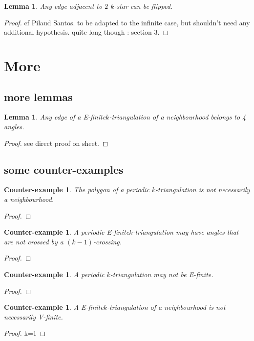 \documentclass{amsart}
\newtheorem{lemma}[theorem]{Lemma}
\newtheorem{ce}[theorem]{Counter-example}
\theoremstyle{remark}
\newcommand*{\nbd}[0]{neighbourhood\xspace}
\newcommand*{\ef}[0]{E-finite\xspace}
\newcommand*{\vf}[0]{V-finite\xspace}
\newcommand*{\ktg}[0]{$k$-triangulation\xspace}
\begin{document}
\begin{lemma}
Any edge adjacent to $2$ $k$-star can be flipped.
\end{lemma}
\begin{proof}
cf Pilaud Santos. to be adapted to the infinite case, but shouldn't need any additional hypothesis. quite long though : section 3.
\end{proof}

\section{More}

\subsection{more lemmas}

\begin{lemma} 
Any edge of a \ef \ktg of a \nbd belongs to 4 angles. 
\end{lemma}
\begin{proof}
see direct proof on sheet.
\end{proof}

\subsection{some counter-examples}

\begin{ce}
The polygon of a periodic \ktg is not necessarily a \nbd.
\end{ce}
\begin{proof}

\end{proof}

\begin{ce}
A periodic \ef \ktg may have angles that are not crossed by a $(k-1)$-crossing.
\end{ce}
\begin{proof}

\end{proof}

\begin{ce} 
A periodic \ktg may not be \ef.
\end{ce}
\begin{proof}

\end{proof}

\begin{ce}
A \ef \ktg of a \nbd is not necessarily \vf.
\end{ce}
\begin{proof}
k=1
\end{proof}






\end{document}
